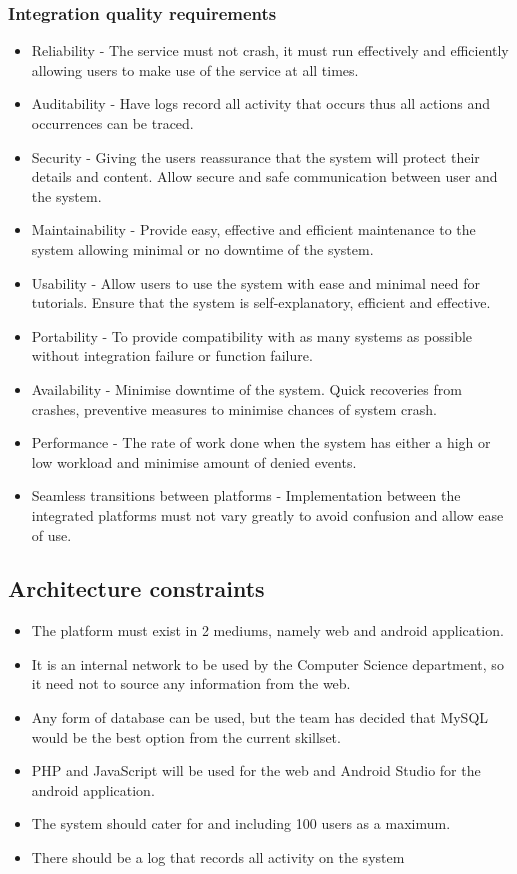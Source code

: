 \documentclass[11pt]{article}
\begin{document}
	\subsubsection{Integration quality requirements}
		\begin{itemize}
			\item Reliability - The service must not crash, it must run effectively and efficiently allowing users to make use of the service at all times.
			\item Auditability - Have logs record all activity that occurs thus all actions and occurrences can be traced.
			\item Security - Giving the users reassurance that the system will protect their details and content. Allow secure and safe communication between user and the system.
			\item Maintainability - Provide easy, effective and efficient maintenance to the system allowing minimal or no downtime of the system.
			\item Usability - Allow users to use the system with ease and minimal need for tutorials. Ensure that the system is self-explanatory, efficient and effective. 
			\item Portability - To provide compatibility with as many systems as possible without integration failure or function failure.
			\item Availability - Minimise downtime of the system. Quick recoveries from crashes, preventive measures to minimise chances of system crash.
			\item Performance - The rate of work done when the system has either a high or low workload and minimise amount of denied events. 
			\item Seamless transitions between platforms - Implementation between the integrated platforms must not vary greatly to avoid confusion and allow ease of use. 
		\end{itemize}

\subsection{Architecture constraints}

\begin{itemize}
	\item The platform must exist in 2 mediums, namely web and android application.
	\item It is an internal network to be used by the Computer Science department, so it need not to source any information from the web.
	\item Any form of database can be used, but the team has decided that MySQL would be the best option from the current skillset.
	\item PHP and JavaScript will be used for the web and Android Studio for the android application.
	\item The system should cater for and including 100 users as a maximum.
	\item There should be a log that records all activity on the system
\end{itemize} 
\end{document}
